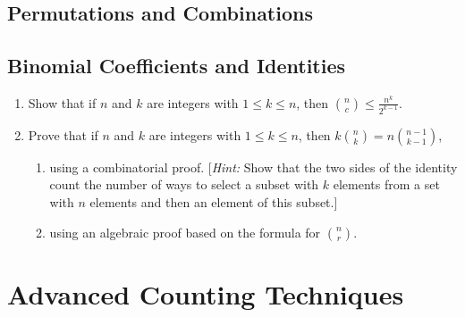 \documentclass{sig-alternate-05-2015}
\begin{document}
\subsection{Permutations and Combinations}
\subsection{Binomial Coefficients and Identities}

\begin{enumerate}
	\item Show that if $n$ and $k$ are integers with $1 \le k \le n$, then $\binom{n}{c} \le \frac{n^k}{2^{k - 1}}$.
	
	\item Prove that if $n$ and $k$ are integers with $1 \le k \le n$, then $k \binom{n}{k} = n \binom{n - 1}{k - 1}$,\begin{enumerate}
		\item using a combinatorial proof. [\textit{Hint:} Show that the two sides of the identity count the number of ways to select a subset with $k$ elements from a set with $n$ elements and then an element of this subset.]
		\item using an algebraic proof based on the formula for $\binom{n}{r}$.
	\end{enumerate}
\end{enumerate}

\section{Advanced Counting Techniques}
\end{document}
